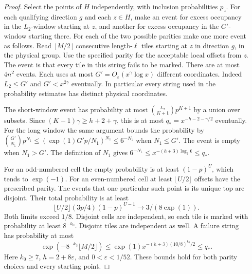 \begin{proof}
Select the points of \(H\) independently, with inclusion probabilities
\(p_z\). For each qualifying direction \(g\) and each \(z\in H\),
make an event for excess occupancy in the \(L_2\)-window starting at
\(z\), and another for excess occupancy in the \(G'\)-window starting
there. For each of the two possible parities make one more event as
follows. Read \(\lfloor M/2\rfloor\) consecutive length-\(\ell\) tiles
starting at \(z\) in direction \(g\), in the physical group. Use the
specified parity for the acceptable local offsets from \(z\). The event
is that every tile in this string fails to be marked. There are at most
\(4n^2\) events. Each uses at most \(G'=O_\varepsilon(x^\gamma\log x)\)
different coordinates. Indeed \(L_2\le G'\) and \(G'<x^{2\gamma}\)
eventually. In particular every string used in the probability estimates
has distinct physical coordinates.

The short-window event has probability at most
\(\binom{L_2}{K+1}p^{K+1}\) by a union over subsets. Since
\((K+1)\gamma\ge h+2+\gamma\), this is at most
\(q_*=x^{-h-2-\gamma/2}\) eventually. For the long window the same
argument bounds the probability by
\(\binom{G'}{N_1}p^{N_1}\le(\exp(1)G'p/N_1)^{N_1}\le6^{-N_1}\)
when \(N_1\le G'\). The event is empty when \(N_1>G'\). The definition
of \(N_1\) gives \(6^{-N_1}\le x^{-(h+3)\log_2 6}\le q_*\).

For an odd-numbered cell the empty probability is at least
\((1-p)^U\), which tends to \(\exp(-1)\). For an even-numbered cell
at least \(\lfloor U/2\rfloor\) offsets have the prescribed parity.
The events that one particular such point is its unique top are
disjoint. Their total probability is at least
\[
 \lfloor U/2\rfloor(3p/4)(1-p)^{U-1}\longrightarrow 3/(8\exp(1)).
\]
Both limits exceed \(1/8\). Disjoint cells are independent, so each
tile is marked with probability at least \(8^{-k_0}\). Disjoint tiles
are independent as well. A failure string has probability at most
\[
 \exp(-8^{-k_0}\lfloor M/2\rfloor)
 \le \exp(1)x^{-(h+3)(10/8)^{k_0}/2}\le q_* .
\]
Here \(k_0\ge7\), \(h=2+8\varepsilon\), and \(0<\varepsilon<1/52\).
These bounds hold for both parity choices and every starting point.


\end{proof}
